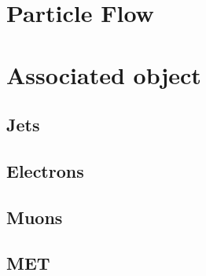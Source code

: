 \section{Particle Flow}

\section{Associated object}
\subsection{Jets}
\subsection{Electrons}
\subsection{Muons}
\subsection{MET}

